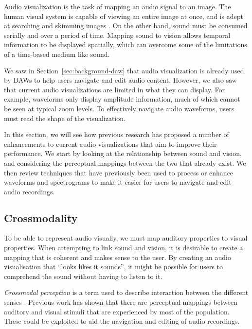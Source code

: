 Audio visualization is the task of mapping an audio signal to an image. The human visual system is capable of viewing
an entire image at once, and is adept at searching and skimming images \citep{Wolfe2004}. On the other hand, sound must
be consumed serially and over a period of time. Mapping sound to vision allows temporal information to be displayed
spatially, which can overcome some of the limitations of a time-based medium like sound.

We saw in Section~\ref{sec:background-daw} that audio visualization is already used by DAWs to help users navigate and
edit audio content.  However, we also saw that current audio visualizations are limited in what they can display.  For
example, waveforms only display amplitude information, much of which cannot be seen at typical zoom levels.  To
effectively navigate audio waveforms, users must read the shape of the visualization.



In this section, we will see how previous research has proposed a number of enhancements to current audio
visualizations that aim to improve their performance.  We start by looking at the relationship between sound and
vision, and considering the perceptual mappings between the two that already exist. We then review techniques that have
previously been used to process or enhance waveforms and spectrograms to make it easier for users to navigate and edit
audio recordings.













\subsection{Crossmodality}\label{sec:crossmodality}
To be able to represent audio visually, we must map auditory properties to visual properties.  When attempting to link
sound and vision, it is desirable to create a mapping that is coherent and makes sense to the user.  By creating an
audio visualisation that ``looks likes it sounds'', it might be possible for users to comprehend the sound without
having to listen to it.

\textit{Crossmodal perception} is a term used to describe interaction between the different senses \citep{Spence2011}.
Previous work has shown that there are perceptual mappings between auditory and visual stimuli that are experienced by
most of the population. These could be exploited to aid the navigation and editing of audio recordings.

